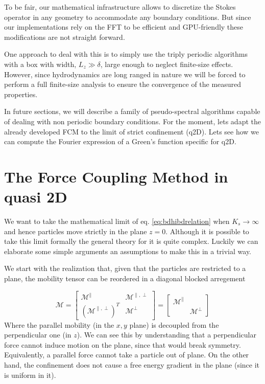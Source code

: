 \documentclass[ twoside,openright,titlepage,numbers=noenddot,%
headinclude,footinclude,cleardoublepage=empty,abstract=on,
BCOR=5mm,paper=a4,fontsize=11pt, dvipsnames
]{scrreprt}
\newcommand{\tens}[1]{\bm{\mathcal{#1}}}
\newcommand{\gpu}{\gls{GPU}\xspace}
\begin{document}
To be fair, our mathematical infrastructure allows to discretize the Stokes operator in any geometry to accommodate any boundary conditions. But since our implementations rely on the \gls{FFT} to be efficient and \gpu-friendly these modifications are not straight forward. 

One approach to deal with this is to simply use the triply periodic algorithms with a box with width, $L_z\gg \delta$, large enough to neglect finite-size effects. However, since hydrodynamics are long ranged in nature we will be forced to perform a full finite-size analysis to ensure the convergence of the measured properties.

In future sections, we will describe a family of pseudo-spectral algorithms capable of dealing with non periodic boundary conditions. For the moment, lets adapt the already developed \gls{FCM} to the limit of strict confinement (q2D). Lets see how we can compute the Fourier expression of a Green's function specific for q2D.

\section{The Force Coupling Method in quasi 2D}

We want to take the mathematical limit of eq. \eqref{eq:bdhibdrelation} when $K_s\rightarrow\infty$ and hence particles move strictly in the plane $z=0$. Although it is possible to take this limit formally the general theory for it is quite complex. Luckily we can elaborate some simple arguments an assumptions to make this in a trivial way.

We start with the realization that, given that the particles are restricted to a plane, the mobility tensor can be reordered in a diagonal blocked arregement 

\begin{equation}
\tens M=\left[\begin{array}{cc}
\tens M^{\parallel} & \tens M^{\parallel,\perp}\\
\left(\tens M^{\parallel,\perp}\right)^{T} & \tens M^{\perp}
\end{array}\right]=\left[\begin{array}{cc}
\tens M^{\parallel}\\
 & \tens M^{\perp}
\end{array}\right]
\end{equation}
Where the parallel mobility (in the $x,y$ plane) is decoupled from the perpendicular one (in $z$). We can see this by understanding that a perpendicular force cannot induce motion on the plane, since that would break symmetry. Equivalently, a parallel force cannot take a particle out of plane. On the other hand, the confinement does not cause a free energy gradient in the plane (since it is uniform in it).
\end{document}
